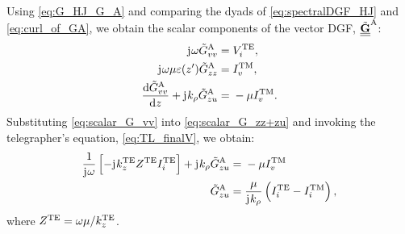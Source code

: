 \documentclass[12pt]{article}
\begin{document}
%
Using \eqref{eq:G_HJ_G_A} and comparing the dyads of \eqref{eq:spectralDGF_HJ} and \eqref{eq:curl_of_GA}, we obtain the scalar components of the vector DGF, $\underline{\underline{\tilde{\mathbf{G}}}}^\mathrm{A}$:
%
\begin{subequations}
  \begin{align}
    \mathrm{j}\mkern1mu \omega  \tilde{G}^\mathrm{A}_{vv} ={}& V_i^{\mathrm{TE}},
    \label{eq:scalar_G_vv}\\
    \mathrm{j}\mkern1mu \omega \mu \varepsilon(z') \tilde{G}^\mathrm{A}_{zz} ={}& I_v^{\mathrm{TM}},
    \label{eq:scalar_G_zz}\\
    \dv{\tilde{G}^\mathrm{A}_{vv}}{z} + \mathrm{j}\mkern1mu k_{\rho} \tilde{G}^\mathrm{A}_{zu} ={}& - \mu I_v^{\mathrm{TM}}.
    \label{eq:scalar_G_zz+zu}
  \end{align}
  \label{eq:components_GA}%
\end{subequations}
%
Substituting \eqref{eq:scalar_G_vv} into \eqref{eq:scalar_G_zz+zu} and invoking the telegrapher's equation, \eqref{eq:TL_finalV}, we obtain:
%
\begin{equation}
  \begin{split}
    \frac{1}{\mathrm{j}\mkern1mu \omega} \left[ -\mathrm{j}\mkern1mu k_z^{\mathrm{TE}} Z^{\mathrm{TE}} I_i^{\mathrm{TE}} \right] + \mathrm{j}\mkern1mu k_{\rho} \tilde{G}^\mathrm{A}_{zu} ={}& - \mu I_v^{\mathrm{TM}} \\
    \tilde{G}^\mathrm{A}_{zu} ={}& \frac{\mu}{\mathrm{j}\mkern1mu k_{\rho}} \left( I_i^{\mathrm{TE}} - I_i^{\mathrm{TM}} \right),
  \end{split}
  \label{eq:scalar_G_zu}
\end{equation}
%
where $Z^{\mathrm{TE}} = \omega \mu/ k_z^{\mathrm{TE}}$.
\end{document}
